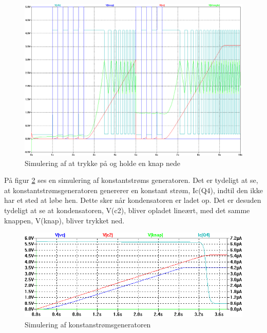 \begin{figure}[h]
\centering
\includegraphics[width=\textwidth]{teknisk/volumenkontrol/stress-test.png}
\caption{Simulering af at trykke på og holde en knap nede}
\label{fig:stresstest}
\end{figure}

På figur \ref{fig:konstantstroem} ses en simulering af konstantstrøms generatoren. Det er tydeligt at se, at konstantstrømsgeneratoren genererer en konstant strøm, Ic(Q4), indtil den ikke har et sted at løbe hen. Dette sker når kondensatoren er ladet op. Det er desuden tydeligt at se at kondensatoren, V(c2), bliver opladet lineært, med det samme knappen, V(knap), bliver trykket ned. 

\begin{figure}[h]
\centering
\includegraphics[width=\textwidth]{teknisk/volumenkontrol/konstantstroem.png}
\caption{Simulering af konstanstrømsgeneratoren}
\label{fig:konstantstroem}
\end{figure}